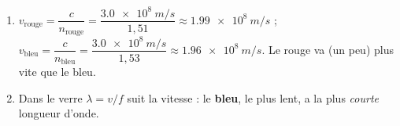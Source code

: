 \documentclass[11pt,a4paper]{article}
\begin{document}
\begin{corrige}
\begin{enumerate}[label=\alph*)]
  \item $v_{\text{rouge}}=\dfrac{c}{n_{\text{rouge}}}=\dfrac{\qty{3.0e8}{m/s}}{1{,}51}\approx\qty{1.99e8}{m/s}$ ;
        $v_{\text{bleu}}=\dfrac{c}{n_{\text{bleu}}}=\dfrac{\qty{3.0e8}{m/s}}{1{,}53}\approx\qty{1.96e8}{m/s}$.
        Le rouge va (un peu) plus vite que le bleu.
  \item Dans le verre $\lambda=v/f$ suit la vitesse : le \textbf{bleu}, le plus lent, a la plus
        \emph{courte} longueur d'onde.
\end{enumerate}
\end{corrige}
\end{document}
